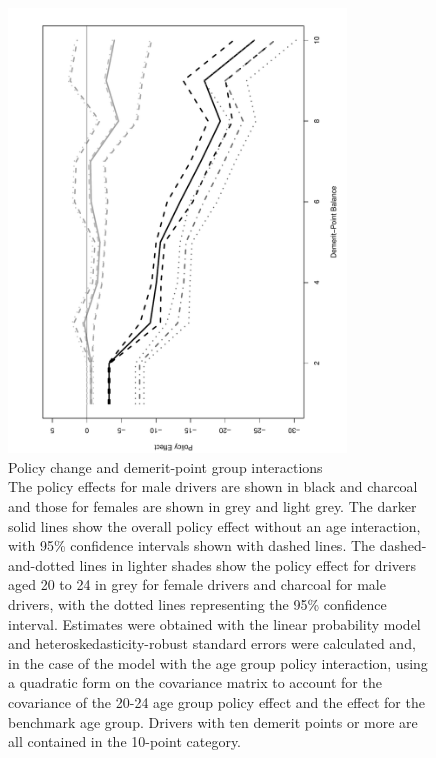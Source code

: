\documentclass{cje}
\begin{document}
\begin{figure}
\centering
\includegraphics[width=0.8\textwidth, angle =270]{Figure3}
\caption{Policy change and demerit-point group interactions \\
The policy effects for male drivers are shown in black and charcoal
and those for females are shown in grey and light grey.
The darker solid lines show the overall policy effect without an age interaction,
with 95\% confidence intervals shown with dashed lines.
The dashed-and-dotted lines in lighter shades show the policy effect 
for drivers aged 20 to 24
in grey for female drivers and charcoal for male drivers,
with the dotted lines representing the 95\% confidence interval.
Estimates were obtained with the linear probability model
and heteroskedasticity-robust standard errors were calculated 
and, in the case of the model with the age group policy interaction,
using a quadratic form on the covariance matrix to account for the covariance of the
20-24 age group policy effect and the effect for the benchmark age group.
Drivers with ten demerit points or more are all contained in the 10-point category.
}\label{fig:points_fig_with_age_int}
\end{figure}


\end{document}

